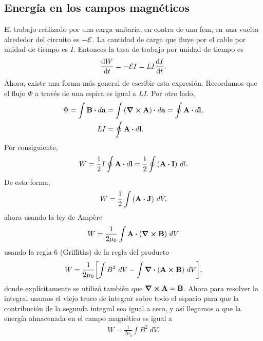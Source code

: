 \subsection{Energía en los campos magnéticos}
El trabajo realizado por una carga unitaria, en contra de una fem, 
en una vuelta alrededor del circuito es $-\mathcal{E}$. La cantidad de carga
que fluye por el cable por unidad de tiempo es $I$. Entonces 
la tasa de trabajo por unidad de tiempo es
\begin{align}
\dv{W}{t}=-\mathcal{E} I=LI \dv{I}{t}.
\end{align}
Ahora, existe una forma más general de escribir esta expresión. 
Recordamos que el flujo $\Phi$ a través de una espira es igual 
a $LI$. Por otro lado, 
\begin{align}
\Phi = \int \vb{B}\vdot d\vb{a}&=\int \qty(\curl{\vb{A}})\vdot d\vb{a}
=\oint \vb{A}\vdot d\vb{l},\\
LI&=\oint \vb{A}\vdot d\vb{l}.
\end{align}
Por consiguiente,
\begin{align}
W=\frac{1}{2}I\oint \vb{A}\vdot d\vb{l}=
\frac{1}{2}\oint \qty(\vb{A}\vdot \vb{I})\ dl.
\end{align}
De esta forma, 
\begin{align}
W=\frac{1}{2}\int \qty(\vb{A}\vdot \vb{J})\ dV,
\end{align}
ahora usando la ley de Ampère
\begin{align}
W=\frac{1}{2\mu_0}\int \vb{A}\vdot \qty(\curl{\vb{B}})\ dV
\end{align}
usando la regla 6 (Griffiths) de la regla del producto
\begin{align}
W=\frac{1}{2\mu_0}\qty[\int B^2\ dV-\int \div{\qty(\vb{A}\cp\vb{B})}\ dV],
\end{align}
donde explícitamente se utilizó también que $\curl{\vb{A}}=\vb{B}$.
Ahora para resolver la integral usamos el viejo truco de integrar sobre todo 
el espacio para que la contribución de la segunda integral sea igual a cero,
y así llegamos a que la energía almacenada en el campo magnético 
es igual a 
\begin{align}
W=\frac{1}{2\mu_0} \int B^2\ dV.
\end{align}

